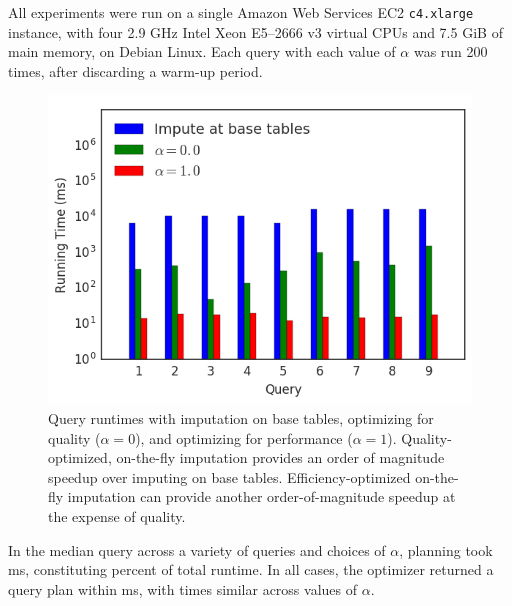 All experiments were run on a single Amazon Web Services EC2 {\tt c4.xlarge} instance, with
four 2.9 GHz Intel Xeon E5--2666 v3 virtual CPUs and 7.5 GiB of main memory, on Debian Linux.
Each query with each value of $\alpha$ was run 200 times, after discarding a warm-up period.

\begin{figure}
\includegraphics[width=\columnwidth]{figures/running_times_combined_bar.png}
\caption{Query runtimes with imputation on base tables, \ProjectName{}
    optimizing for quality ($\alpha=0$), and \ProjectName{} optimizing for
    performance ($\alpha=1$). Quality-optimized, on-the-fly imputation provides an order of
    magnitude speedup over imputing on base tables. Efficiency-optimized on-the-fly
    imputation can provide another order-of-magnitude speedup at the expense of quality.}
    
\label{fig:runtimes}
\end{figure}


In the median query across a variety of queries and choices of $\alpha$, planning took
\planningmediantime{} ms, 
constituting \planningruntimepercent{} percent of total runtime. In all cases, the optimizer
returned a query plan within \planningmaxtime{} ms, with times similar across values of $\alpha$.


